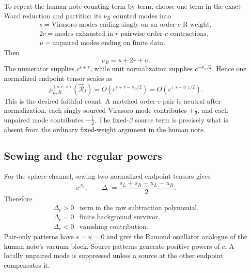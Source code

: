 \documentclass[11pt]{article}
\begin{document}
To repeat the human-note counting term by term, choose one term in the
exact Ward reduction and partition its \(\nu_R\) counted modes into
\begin{equation}
 \begin{gathered}
 s=\text{Virasoro modes ending singly on an order-\(c\) R weight},\\
 2r=\text{modes exhausted in \(r\) pairwise order-\(c\) contractions},\\
 u=\text{unpaired modes ending on finite data}.
 \end{gathered}
 \label{eq:precontract-sru-definition}
\end{equation}
Then
\begin{equation}
 \nu_R=s+2r+u.
 \label{eq:precontract-sru-partition}
\end{equation}
The numerator supplies \(c^{s+r}\), while unit normalization supplies
\(c^{-\nu_R/2}\).  Hence one normalized endpoint tensor scales as
\begin{equation}
 \boxed{
 \rho_{L,R}^{(s,r,u)}(\widehat{\mathcal R}_I)
 =O\!\left(c^{s+r-\nu_R/2}\right)
 =O\!\left(c^{(s-u)/2}\right).}
 \label{eq:precontract-normalized-three-point-count}
\end{equation}
This is the desired faithful count.  A matched order-\(c\) pair is neutral
after normalization, each singly sourced Virasoro mode contributes
\(+\tfrac12\), and each unpaired mode contributes \(-\tfrac12\).  The
fixed-\(\beta\) source term is precisely what is absent from the ordinary
fixed-weight argument in the human note.

\subsection{Sewing and the regular powers}

For the sphere channel, sewing two normalized endpoint tensors gives
\begin{equation}
 c^{\Delta_e},
 \qquad
 \boxed{
 \Delta_e=\frac{s_L+s_R-u_L-u_R}{2}.}
 \label{eq:precontract-sphere-power-balance}
\end{equation}
Therefore
\begin{equation}
 \begin{array}{c|c}
 \Delta_e>0&\text{term in the raw subtraction polynomial},\\
 \Delta_e=0&\text{finite background survivor},\\
 \Delta_e<0&\text{vanishing contribution}.
 \end{array}
 \label{eq:precontract-power-classification}
\end{equation}
Pair-only patterns have \(s=u=0\) and give the Ramond oscillator analogue
of the human note's vacuum block.  Source patterns generate positive powers
of \(c\).  A locally unpaired mode is suppressed unless a source at the
other endpoint compensates it.
\end{document}
